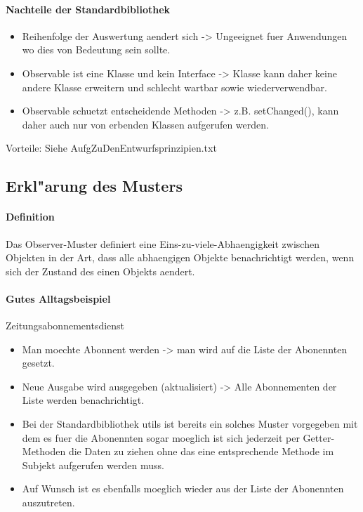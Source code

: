 \paragraph{Nachteile der Standardbibliothek}
\begin{itemize}
\item Reihenfolge der Auswertung aendert sich -> Ungeeignet fuer Anwendungen wo dies von Bedeutung 
  sein sollte.
\item Observable ist eine Klasse und kein Interface -> Klasse kann daher keine andere Klasse 
  erweitern und schlecht wartbar sowie wiederverwendbar.
\item Observable schuetzt entscheidende Methoden -> z.B. setChanged(), kann daher auch nur von 
  erbenden Klassen aufgerufen werden.
\end{itemize}
  
Vorteile: Siehe AufgZuDenEntwurfsprinzipien.txt

\subsection{Erkl"arung des Musters}
\paragraph{Definition}
Das Observer-Muster definiert eine Eins-zu-viele-Abhaengigkeit zwischen Objekten in der Art, dass 
alle abhaengigen Objekte benachrichtigt werden, wenn sich der Zustand des einen Objekts aendert. 

\paragraph{Gutes Alltagsbeispiel} 
Zeitungsabonnementsdienst
\begin{itemize}
\item Man moechte Abonnent werden -> man wird auf die Liste der Abonennten gesetzt. 
\item Neue Ausgabe wird ausgegeben (aktualisiert) -> Alle Abonnementen der Liste werden benachrichtigt. 
\item Bei der Standardbibliothek utils ist bereits ein solches Muster vorgegeben mit dem es fuer die 
  Abonennten sogar moeglich ist sich jederzeit per Getter-Methoden die Daten zu ziehen ohne das 
  eine entsprechende Methode im Subjekt aufgerufen werden muss.
\item Auf Wunsch ist es ebenfalls moeglich wieder aus der Liste der Abonennten auszutreten. 
\end{itemize}

